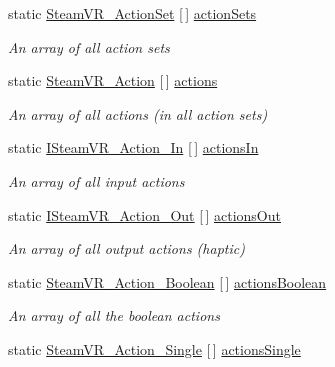 \begin{DoxyCompactItemize}
static \mbox{\hyperlink{class_valve_1_1_v_r_1_1_steam_v_r___action_set}{Steam\+V\+R\+\_\+\+Action\+Set}} \mbox{[}$\,$\mbox{]} \mbox{\hyperlink{class_valve_1_1_v_r_1_1_steam_v_r___input_ab466c62bf633cec28ba1c4917f46cea9}{action\+Sets}}
\begin{DoxyCompactList}\small\item\em An array of all action sets \end{DoxyCompactList}\item 
static \mbox{\hyperlink{class_valve_1_1_v_r_1_1_steam_v_r___action}{Steam\+V\+R\+\_\+\+Action}} \mbox{[}$\,$\mbox{]} \mbox{\hyperlink{class_valve_1_1_v_r_1_1_steam_v_r___input_ad3cc52ba6a3fe1eb4c49fb00d49439eb}{actions}}
\begin{DoxyCompactList}\small\item\em An array of all actions (in all action sets) \end{DoxyCompactList}\item 
static \mbox{\hyperlink{interface_valve_1_1_v_r_1_1_i_steam_v_r___action___in}{I\+Steam\+V\+R\+\_\+\+Action\+\_\+\+In}} \mbox{[}$\,$\mbox{]} \mbox{\hyperlink{class_valve_1_1_v_r_1_1_steam_v_r___input_ac04e5705019bed32bae4a7d502d862b7}{actions\+In}}
\begin{DoxyCompactList}\small\item\em An array of all input actions \end{DoxyCompactList}\item 
static \mbox{\hyperlink{interface_valve_1_1_v_r_1_1_i_steam_v_r___action___out}{I\+Steam\+V\+R\+\_\+\+Action\+\_\+\+Out}} \mbox{[}$\,$\mbox{]} \mbox{\hyperlink{class_valve_1_1_v_r_1_1_steam_v_r___input_aefbdcd03e7607dc2d129578b59be3d12}{actions\+Out}}
\begin{DoxyCompactList}\small\item\em An array of all output actions (haptic) \end{DoxyCompactList}\item 
static \mbox{\hyperlink{class_valve_1_1_v_r_1_1_steam_v_r___action___boolean}{Steam\+V\+R\+\_\+\+Action\+\_\+\+Boolean}} \mbox{[}$\,$\mbox{]} \mbox{\hyperlink{class_valve_1_1_v_r_1_1_steam_v_r___input_aad6fcf2a2f0e959e95a7021a70870bc2}{actions\+Boolean}}
\begin{DoxyCompactList}\small\item\em An array of all the boolean actions \end{DoxyCompactList}\item 
static \mbox{\hyperlink{class_valve_1_1_v_r_1_1_steam_v_r___action___single}{Steam\+V\+R\+\_\+\+Action\+\_\+\+Single}} \mbox{[}$\,$\mbox{]} \mbox{\hyperlink{class_valve_1_1_v_r_1_1_steam_v_r___input_a3a9ab2b76d747b4f16f984b6963f4bc1}{actions\+Single}}

\end{DoxyCompactItemize}
